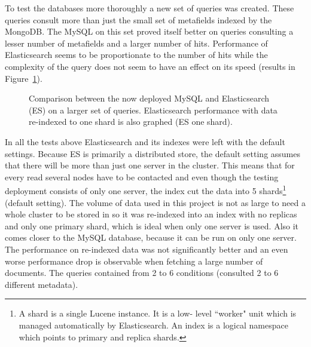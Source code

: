 To test the databases more thoroughly a new set of queries was created. These queries consult more than just the 
small set of metafields indexed by the MongoDB. The MySQL on this set proved itself better on queries consulting
a lesser number of metafields and a larger number of hits. Performance of Elasticsearch seems to be proportionate
to the number of hits while the complexity of the query does not seem to have an effect on its speed (results in 
Figure~\ref{fig:wide}).

\begin{figure}[h]
	\centering
	
	\caption{Comparison between the now deployed MySQL and Elasticsearch (ES) on a larger set of queries. 
	Elasticsearch performance with data re-indexed to one shard is also graphed (ES one shard).}
	\label{fig:wide}
\end{figure}

In all the tests above Elasticsearch and its indexes were left with the default settings. Because ES is primarily 
a distributed store, the default setting assumes that there will be more than just one server in the cluster. This
means that for every read several nodes have to be contacted and even though the testing deployment consists of 
only one server, the index cut the data into 5 shards\footnote{A shard is a single Lucene instance. It is a low-
level ``worker" unit which is managed automatically by Elasticsearch. An index is a logical namespace which points 
to primary and replica shards.} (default setting). The volume of data used 
in this project is not as large to need a whole cluster to be stored in so it was re-indexed into an index 
with no replicas and only one primary shard, which is ideal when only one server is used. Also it comes closer to 
the MySQL database, because it can be run on only one server. The performance on re-indexed data was not 
significantly better and an even worse performance drop is observable when fetching a large number of documents. 
The queries contained from 2 to 6 conditions (consulted 2 to 6 different metadata).